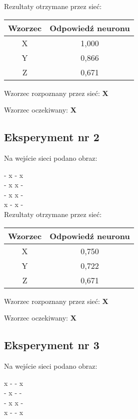 \documentclass[12pt]{article}
\begin{document}
Rezultaty otrzymane przez sieć:

\begin{table}[h]
\begin{tabular}{|c|c|}
\hline 
Wzorzec & Odpowiedź neuronu \\ 
\hline 
X & 1,000 \\ \hline 
Y & 0,866 \\ \hline 
Z & 0,671 \\ \hline 
\end{tabular} 
\end{table}

Wzorzec rozpoznany przez sieć: \textbf{X}

Wzorzec oczekiwany: \textbf{X}

\subsection{Eksperyment nr 2}

Na wejście sieci podano obraz:

\noindent
- x - x \\
- x x - \\
- x x - \\
x - x - \\

Rezultaty otrzymane przez sieć:

\begin{table}[h]
\begin{tabular}{|c|c|}
\hline 
Wzorzec & Odpowiedź neuronu \\ 
\hline 
X & 0,750 \\ \hline 
Y & 0,722 \\ \hline 
Z & 0,671 \\ \hline 
\end{tabular} 
\end{table}

Wzorzec rozpoznany przez sieć: \textbf{X}

Wzorzec oczekiwany: \textbf{X}

\clearpage

\subsection{Eksperyment nr 3}

Na wejście sieci podano obraz:

\noindent
x - - x \\
- x - - \\
- x x - \\
x - - x \\
\end{document}
